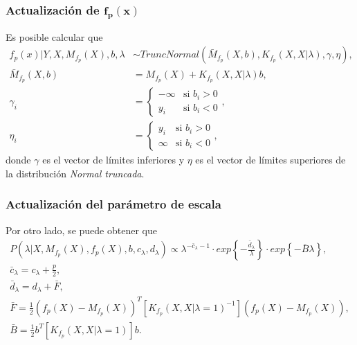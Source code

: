 \subsubsection{Actualizaci\'on de $\bm{f_p(x)}$}

Es posible calcular que
\begin{equation*}
\begin{aligned}
   f_p(x)|Y,X,M_{f_p}(X),b,\lambda &\sim TruncNormal(\bar{M}_{f_p}(X,b), K_{f_p}(X,X|\lambda), \gamma, \eta), \\
   \bar{M}_{f_p}(X,b) &= M_{f_p}(X) + K_{f_p}(X,X|\lambda)b, \\
   \gamma_i &= 
   \begin{cases}
    -\infty & \text{si }b_i > 0 \\
    y_i & \text{si }b_i < 0
   \end{cases},\\
   \eta_i &= 
   \begin{cases}
    y_i & \text{si }b_i > 0 \\
    \infty & \text{si }b_i < 0
   \end{cases},
\end{aligned}
\end{equation*}
donde $\gamma$ es el vector de l\'imites inferiores y $\eta$ es el vector de l\'imites superiores de la distribuci\'on \textit{Normal truncada}.

\subsubsection{Actualizaci\'on del par\'ametro de escala}

Por otro lado, se puede obtener que
\begin{equation*}
\begin{gathered}
   P(\lambda|X,M_{f_p}(X),f_p(X),b,c_\lambda,d_\lambda) 
   \propto
   \lambda^{-\bar{c}_\lambda-1}
   \cdot
   exp\left\{- \frac{\bar{d}_\lambda}{\lambda}\right\}
   \cdot
   exp\left\{-\bar{B} \lambda\right\}, \\
   \bar{c}_\lambda = c_\lambda + \frac{p}{2}, \\
   \bar{d}_\lambda = d_\lambda + \bar{F}, \\
   \bar{F} = \frac{1}{2}(f_p(X)-M_{f_p}(X))^T [K_{f_p}(X,X|\lambda=1)^{-1}] (f_p(X)-M_{f_p}(X)), \\
   \bar{B} = \frac{1}{2}b^T [K_{f_p}(X,X|\lambda=1)] b.
\end{gathered}
\end{equation*}

